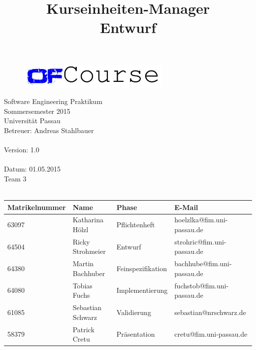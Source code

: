 \documentclass[a4paper, 12pt]{scrreprt}
\begin{document}
	\thispagestyle{plain}

\begin{titlepage}
    \begin{center}
        
        \begin{figure}[ht]
        	\centering
        	\includegraphics[width=0.66\textwidth, angle=0]{logo/name_blau_ofCourse.jpg}
        \end{figure}
        
    	\begin{title}
        	\title{\Huge{\textbf{Kurseinheiten-Manager \\ Entwurf\\}}}

		\end{title}
		\hspace{3cm}

        	Software Engineering Praktikum \\
        	Sommersemester 2015\\
        	Universität Passau\\


        	Betreuer: Andreas Stahlbauer \\
        	\hspace{1,5cm}\\
        	Version: 1.0 \\
        	\hspace{1,5cm}\\
        	Datum: 01.05.2015\\[50pt]
        	Team 3 \\
    
		    \ \\
        
        
        \begin{tabular}{ | l | l | l | l |}
            \hline
             \textbf{Matrikelnummer} & \textbf{Name} & \textbf{Phase} & \textbf{E-Mail}  \\ \hline
             63097 & Katharina Hölzl & Pflichtenheft & hoelzlka@fim.uni-passau.de \\ \hline
             64504 & Ricky Strohmeier& Entwurf & strohric@fim.uni-passau.de  \\ \hline
             64380 & Martin Bachhuber & Feinspezifikation  & bachhube@fim.uni-passau.de \\ \hline
             64080 & Tobias Fuchs & Implementierung  &  fuchstob@fim.uni-passau.de\\ \hline
             61085 & Sebastian Schwarz & Validierung & sebastian@nrschwarz.de \\ \hline  
             58379 & Patrick Cretu  &  Präsentation & cretu@fim.uni-passau.de \\ \hline
        \end{tabular}
    \end{center}
\end{titlepage}



\tableofcontents








\end{document}
